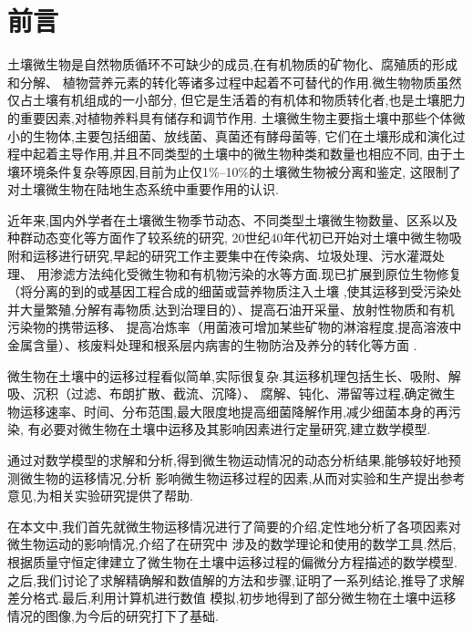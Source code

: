 \chapter*{前\qquad 言}
土壤微生物是自然物质循环不可缺少的成员,在有机物质的矿物化、腐殖质的形成和分解、
植物营养元素的转化等诸多过程中起着不可替代的作用.微生物物质虽然仅占土壤有机组成的一小部分,
但它是生活着的有机体和物质转化者,也是土壤肥力的重要因素,对植物养料具有储存和调节作用.
土壤微生物主要指土壤中那些个体微小的生物体,主要包括细菌、放线菌、真菌还有酵母菌等,
它们在土壤形成和演化过程中起着主导作用,并且不同类型的土壤中的微生物种类和数量也相应不同,
由于土壤环境条件复杂等原因,目前为止仅1\%--10\%的土壤微生物被分离和鉴定,
这限制了对土壤微生物在陆地生态系统中重要作用的认识.\par
近年来,国内外学者在土壤微生物季节动态、不同类型土壤微生物数量、区系以及种群动态变化等方面作了较系统的研究,
20世纪40年代初已开始对土壤中微生物吸附和运移进行研究,早起的研究工作主要集中在传染病、垃圾处理、污水灌溉处理、
用渗滤方法纯化受微生物和有机物污染的水等方面.现已扩展到原位生物修复（将分离的到的或基因工程合成的细菌或营养物质注入土壤
,使其运移到受污染处并大量繁殖,分解有毒物质,达到治理目的）、提高石油开采量、放射性物质和有机污染物的携带运移、
提高冶炼率（用菌液可增加某些矿物的淋溶程度,提高溶液中金属含量）、核废料处理和根系层内病害的生物防治及养分的转化等方面
.\par
微生物在土壤中的运移过程看似简单,实际很复杂.其运移机理包括生长、吸附、解吸、沉积（过滤、布朗扩散、截流、沉降）、
腐解、钝化、滞留等过程,确定微生物运移速率、时间、分布范围,最大限度地提高细菌降解作用,减少细菌本身的再污染,
有必要对微生物在土壤中运移及其影响因素进行定量研究,建立数学模型.\par
通过对数学模型的求解和分析,得到微生物运动情况的动态分析结果,能够较好地预测微生物的运移情况,分析
影响微生物运移过程的因素,从而对实验和生产提出参考意见,为相关实验研究提供了帮助.\par
在本文中,我们首先就微生物运移情况进行了简要的介绍,定性地分析了各项因素对微生物运动的影响情况,介绍了在研究中
涉及的数学理论和使用的数学工具.然后,根据质量守恒定律建立了微生物在土壤中运移过程的偏微分方程描述的数学模型.
之后,我们讨论了求解精确解和数值解的方法和步骤,证明了一系列结论,推导了求解差分格式.最后,利用计算机进行数值
模拟,初步地得到了部分微生物在土壤中运移情况的图像,为今后的研究打下了基础.
